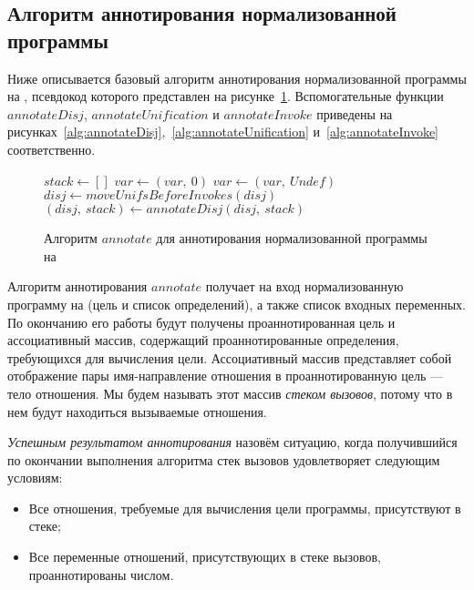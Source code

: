 \subsection{Алгоритм аннотирования нормализованной программы}
\label{lab:coreAnn}

Ниже описывается базовый алгоритм аннотирования нормализованной программы на \miniKanren{}, псевдокод которого представлен на рисунке~\ref{alg:annotate}.
Вспомогательные функции $annotateDisj$, $annotateUnification$ и $annotateInvoke$ приведены на рисунках~\ref{alg:annotateDisj},~\ref{alg:annotateUnification} и~\ref{alg:annotateInvoke} соответственно.

\begin{figure}[h!]
  \begin{center}
  \begin{minipage}{1.1\textwidth}
\begin{algorithm}[H]
  $stack \gets []$\;
   {
     {
      $var \gets (var,~0)$
    }{
      $var \gets (var,~Undef)$
    }
  }
   {
    $disj \gets moveUnifsBeforeInvokes(disj)$\;
    $(disj,~stack) \gets annotateDisj(disj,~stack)$
  }
\end{algorithm}
  \end{minipage}
  \end{center}
  \caption{Алгоритм $annotate$ для аннотирования нормализованной программы на \miniKanren{}}
  \label{alg:annotate}
\end{figure}

Алгоритм аннотирования $annotate$ получает на вход нормализованную программу на \miniKanren{} (цель и список определений), а также список входных переменных.
По окончанию его работы будут получены проаннотированная цель и ассоциативный массив, содержащий проаннотированные определения, требующихся для вычисления цели.
Ассоциативный массив представляет собой отображение пары имя-направление отношения в проаннотированную цель --- тело отношения.
Мы будем называть этот массив \emph{стеком вызовов}, потому что в нем будут находиться вызываемые отношения.

\emph{Успешным результатом аннотирования} назовём ситуацию, когда получившийся по окончании выполнения алгоритма стек вызовов удовлетворяет следующим условиям:
\begin{itemize}
    \item Все отношения, требуемые для вычисления цели программы, присутствуют в стеке;
    \item Все переменные отношений, присутствующих в стеке вызовов, проаннотированы числом.
\end{itemize}

